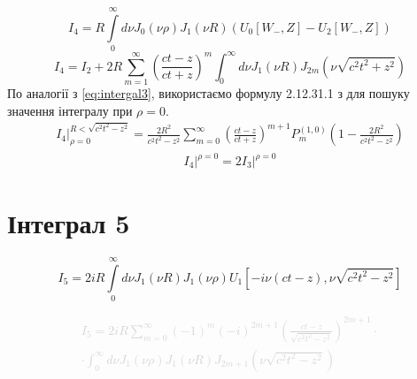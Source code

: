\begin{equation}
I_4 = R \int \limits_{0}^{\infty} d \nu J_0(\nu \rho) J_1(\nu R) 
(U_0[ W_-, Z ] - U_2[ W_-, Z ])
\end{equation}
%
\begin{equation} \label{eq:i4_pol_int}
I_4 = I_2 + 2 R \sum_{m=1}^{\infty} \left( \frac{ct - z}{ct + z} \right)^m 
\int_{0}^{\infty} d \nu J_1(\nu R) J_{2m} (\nu \sqrt{c^2t^2 + z^2})
\end{equation}
%
По аналогії з \eqref{eq:intergal3}, використаємо формулу 2.12.31.1 з 
\cite[ст. 209]{imp:SpecFunc1983} для пошуку значення інтегралу при $ \rho = 0 $.
%
\begin{equation*} \begin{aligned}
\left. I_4 \right|_{\rho = 0}^{R < \sqrt{c^2 t^2 - z^2}} = 
\frac{2 R^2}{c^2 t^2 - z^2} \sum_{m=0}^{\infty} 
\left( \frac{ct - z}{ct + z} \right)^{m+1} P_{m}^{(1,0)} 
\left( 1 - \frac{2R^2}{c^2 t^2 - z^2} \right)
\end{aligned} \end{equation*}
%
\begin{equation} \begin{aligned} \label{eq:i4onaxis}
\left. I_4 \right|^{\rho = 0} = 2 \left. I_3 \right|^{\rho = 0}
\end{aligned} \end{equation}

\section{Інтеграл 5}

\begin{equation}
I_5 = 2 i R \int \limits_{0}^{\infty} d \nu 
J_1 \left( \nu R \right) J_1 \left( \nu \rho \right)
U_1 \left[ - i \nu \left( ct - z \right), \nu \sqrt{c^2t^2 - z^2} \right]
\end{equation}

\textcolor{lightgray}{ \begin{equation*} \begin{aligned}
I_5 = 2 i R \sum_{m=0}^{\infty} (-1)^m (-i)^{2m+1}
\left( \frac{ct-z}{\sqrt{c^2t^2-z^2}} \right)^{2m+1} \cdot \\ 
\cdot \int_0^\infty d \nu J_1(\nu \rho) J_1(\nu R) 
J_{2m+1} \left( \nu \sqrt{c^2t^2 - z^2} \right)
\end{aligned}  \end{equation*} }


